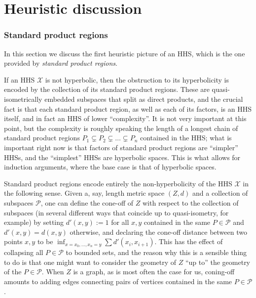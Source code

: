 \documentclass[11pt,oneside]{amsart}
\theoremstyle{definition}
\newcommand{\cuco}[1]{{\mathcal #1}}
\begin{document}
\part{Heuristic discussion}\label{part:heuristic}

\section{Standard product regions}
In this section we discuss the first heuristic picture of an HHS, which is the one provided by \emph{standard product regions}.

If an HHS $\cuco X$ is not hyperbolic, then the obstruction to its hyperbolicity is encoded by the collection of its standard product regions. These are quasi-isometrically embedded subspaces that split as direct products, and the crucial fact is that each standard product region, as well as each of its factors, is an HHS itself, and in fact an HHS of lower ``complexity''. It is not very important at this point, but the complexity is roughly speaking the length of a longest chain of standard product regions $P_1\subsetneq P_2\subsetneq \dots\subsetneq P_n$ contained in the HHS; what is important right now is that factors of standard product regions are ``simpler'' HHSs, and the ``simplest'' HHSs are hyperbolic spaces. This is what allows for induction arguments, where the base case is that of hyperbolic spaces.

Standard product regions encode entirely the non-hyperbolicity of the HHS $\cuco X$ in the following sense. Given a, say, length metric space $(Z,d)$ and a collection of subspaces $\mathcal P$, one can define the cone-off of $Z$ with respect to the collection of subspaces (in several different ways that coincide up to quasi-isometry, for example) by setting $d'(x,y):=1$ for all $x,y$ contained in the same $P\in\mathcal P$ and $d'(x,y)=d(x,y)$ otherwise, and declaring the cone-off distance between two points $x,y$ to be $\inf_{x=x_0,\dots,x_n=y}\sum d'(x_i,x_{i+1})$. This has the effect of collapsing all $P\in\mathcal P$ to bounded sets, and the reason why this is a sensible thing to do is that one might want to consider the geometry of $Z$ ``up to'' the geometry of the $P\in\mathcal P$. When $Z$ is a graph, as is most often the case for us, coning-off amounts to adding edges connecting pairs of vertices contained in the same $P\in\mathcal P$.
\end{document}
